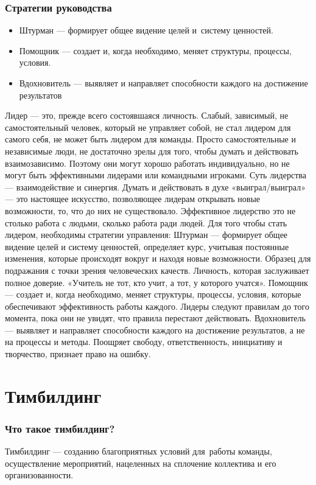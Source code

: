 \documentclass{../industrial-development}
\begin{document}
\begin{frame} \frametitle{Стратегии руководства }
  \begin{itemize}
  \item Штурман — формирует общее видение целей и~систему ценностей.
  \item Помощник — создает и, когда необходимо, меняет структуры, процессы, условия.
  \item Вдохновитель — выявляет и направляет способности каждого на достижение результатов
  \end{itemize}
\end{frame}

\lecturenotes

Лидер — это, прежде всего состоявшаяся личность. Слабый, зависимый, не самостоятельный человек, который не управляет собой, не стал лидером для самого себя, не может быть лидером для команды. Просто самостоятельные и независимые люди, не достаточно зрелы для того, чтобы думать и действовать взаимозависимо. Поэтому они могут хорошо работать индивидуально, но не могут быть эффективными лидерами или командными игроками. Суть лидерства — взаимодействие и синергия. Думать и действовать в духе «выиграл/выиграл» — это настоящее искусство, позволяющее лидерам открывать новые возможности, то, что до них не существовало. Эффективное лидерство это не столько работа с людьми, сколько работа ради людей. Для того чтобы стать лидером, необходимы стратегии управления:
Штурман — формирует общее видение целей и систему ценностей, определяет курс, учитывая постоянные изменения, которые происходят вокруг и находя новые возможности.
Образец для подражания с точки зрения человеческих качеств. Личность, которая заслуживает полное доверие. «Учитель не тот, кто учит, а тот, у которого учатся».
Помощник — создает и, когда необходимо, меняет структуры, процессы, условия, которые обеспечивают эффективность работы каждого. Лидеры следуют правилам до того момента, пока они не увидят, что правила перестают действовать.
Вдохновитель — выявляет и направляет способности каждого на достижение результатов, а не на процессы и методы. Поощряет свободу, ответственность, инициативу и творчество, признает право на ошибку.

\section{Тимбилдинг}

\begin{frame} \frametitle{Что такое тимбилдинг?}
\begin{block}{}
Тимбилдинг --- созданию благоприятных условий для~работы команды, осуществление мероприятий, нацеленных на сплочение коллектива и его организованности.
\end{block}
\end{frame}
\end{document}
